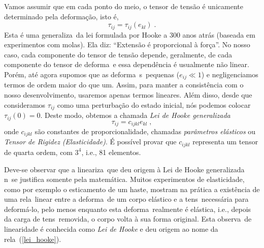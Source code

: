 Vamos assumir que em cada ponto do meio, o tensor de tens\~ao \'e
unicamente determinado pela deforma\c{c}\~ao, isto \'e,
\begin{equation}
\tau_{ij}=\tau_{ij}(e_{kl}) \;.
\label{rel_tens_def}
\end{equation}
Esta \'e uma generaliza\cao\ da lei formulada por Hooke a 300 anos atr\'as
(baseada em experimentos com molas). Ela diz: ``Extens\~ao \'e proporcional
\`a for\c{c}a''. No nosso caso,
cada componente do tensor de tens\~ao depende, geralmente, de
cada componente do tensor de deforma\cao\ e essa depend\^encia
\'e usualmente n\~ao linear.
Por\'em, at\'e agora supomos que as deforma\coes\ s\ao\ pequenas
($e_{ij}\ll 1$) e negligenciamos termos de ordem maior do que um. Assim,
para manter a consist\^encia com o nosso desenvolvimento,
usaremos apenas termos lineares. Al\'em disso, desde que consideramos
$\tau_{ij}$ como uma perturba\c{c}\~ao do estado inicial, n\'os podemos
colocar $\tau_{ij}(0)=0$. Deste modo, obtemos a chamada {\it Lei de Hooke
generalizada}
\begin{equation}
\tau_{ij}=c_{ijkl}e_{kl} \;,
\label{lei_hooke}
\end{equation}
onde $c_{ijkl}$ s\~ao constantes de proporcionalidade, chamadas {\it
par\^ametros el\'asticos} ou {\it Tensor de Rigidez (Elasticidade)}.
\'E poss\'ivel provar que $c_{ijkl}$ representa um tensor de quarta
ordem, com $3^4$, i.e., 81 elementos.

Deve-se observar que a lineariza\cao\ que deu origem \`a Lei de Hooke
generalizada n\ao\ se justifica somente pela matem\'atica. Muitos
experimentos de elasticidade, como por exemplo o esticamento de um
haste, mostram na pr\'atica a exist\^encia de uma rela\cao\ linear entre
a deforma\cao\ de um corpo el\'astico e a tens\ao\ necess\'aria para
deform\'a-lo, pelo menos enquanto esta deforma\cao\ realmente \'e
el\'astica, i.e., depois da carga de tens\ao\ removida, o corpo volta
\`a sua forma original. Esta observa\cao\ de linearidade \'e conhecida
como {\em Lei de Hooke} e deu origem ao nome da rela\cao\
(\ref{lei_hooke}).

